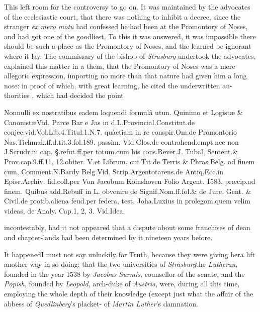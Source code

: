 \documentclass{article}
\begin{document}
This left room for the controversy to go on. It was maintained by the advocates
of the ecclesiastic court, that there was nothing to inhibit a decree, since
the stranger \textit{ex mero motu} had confessed he had been at the Promontory of
Noses, and had got one of the goodliest, \etc\etc\break
\tsk To this
it was answered, it was impossible there should be such a place as the
Promontory of Noses, and the learned be ignorant where it lay. The commissary
of the bishop of \textit{Strasburg} undertook the
advocates, explained this matter in a\break
{}
them, that the Promontory of Noses was
a mere allegoric expression, importing no more than that nature
had given him a long nose: in proof of which, with great learning, he cited the
underwritten au-\break
thorities \fnast, which had decided the point\break
{}

\vfill
\begingroup\footnotesize
\indent\fnast\enspace Nonnulli ex nostratibus eadem loquendi 
formulâ utun. Quinimo et Logistæ \& Canonistæ\tsh Vid.\@
Parce Bar e Jas in d.\@ L.\@ Provincial.Constitut.\break de
conjec.\@ vid.\@ Vol.\@ Lib.\@ 4.\@ Titul.\@ 1.\@ N.\@ 7.\@
quà\break etiam in re conspir.\@ Om.\@ de Promontorio
Nas.\break Tichmak.\@ ff.\@ d.\@ tit.\@ 3.\@ fol.\@ 189.\@
passim. Vid.\@ Glos.\break de contrahend.\@ empt.\etc nec
non J.\@ Scrudr.\@ in cap.\break 
§.\@ refut.\@ ff.\@ per totum.\@ cum his cons.\@ Rever.\@ J.\break
Tubal, Sentent.\@ \& Prov.\@ cap.\@ 9.\@ ff.\@ 11, 12.\@ obiter.\break  
V.\@ et Librum, cui Tit.\@ de Terris \& Phras.\@ Belg.\break
ad finem cum, Comment.\@ N.\@ Bardy Belg.\@ Vid.\break
Scrip.\@ Argentotarens.\@ de Antiq.\@ Ecc.\@ in Episc.\@ Ar\-chiv.\@
fid.\@ coll.\@ per Von Jacobum Koinshoven Fo\-lio Argent.\@
1583, præcip.\@ ad finem.  Quibus add.\@ Rebuff in L.\@
obvenire de Signif.\@ Nom.\@ ff.\@ fol.\@ \& de Jure, Gent.\@
\& Civil.\@ de protib.\@ aliena feud.\@ per federa, test.\@
Joha.\@ Luxius in prolegom.\@ quem velim videas, de Analy.\@
Cap.\@ 1, 2, 3. Vid.\@ Idea.\par\endgroup

\newpage\noindent
incontestably, had it not appeared that a dispute
about some franchises of dean and chapter-lands had been determined by it
nineteen years before.

It happened\tsk I must not say unluckily for Truth, because
they were giving her\break a lift another way in so doing;
that the two universities of \textit{Strasburg}\tsk the
\textit{Luthe\-ran}, founded in the year 1538 by
\textit{Jacobus Surmis}, counsellor of the senate,\tsk
and\break
the \textit{Popish}, founded by \textit{Leopold}, arch-duke
of \textit{Austria}, were, during all this time,\break 
employing the whole depth of their\break 
knowledge (except just what the affair\break
of the abbess of \textit{Quedlinberg}’s placket-\break
{}
of \textit{Martin Luther}’s damnation.
\end{document}
